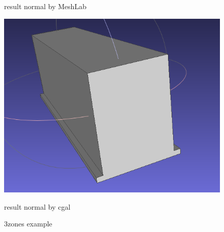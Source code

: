 \documentclass{article}
\begin{document}
\begin{figure}[H]
\begin{minipage}[t]{0.29\textwidth}
    \caption*{result normal by MeshLab}
  \end{minipage}
  \hspace{0.05\textwidth}
  \begin{minipage}[t]{0.27\textwidth}
    \includegraphics[width=\textwidth]{../../images/screen_kinetic/3zones_result_normal_cgal.png}
    \caption*{result normal by cgal}
  \end{minipage}
  \caption{3zones example}
\end{figure}  
\end{document}
